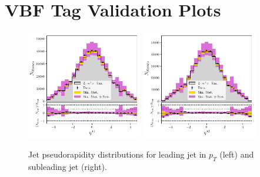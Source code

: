 

\chapter{VBF Tag \Zee Validation Plots}



\begin{figure}[h!]
    \begin{center}
        \includegraphics[width=0.45\textwidth]{figures/appendix_zee/lead_jet_eta_zee_LPS.pdf}
        \includegraphics[width=0.45\textwidth]{figures/appendix_zee/sublead_jet_eta_zee_LPS.pdf}
    \end{center}
    \caption{Jet pseudorapidity distributions for leading jet in $p_T$ (left) and subleading jet (right).}
\end{figure}

